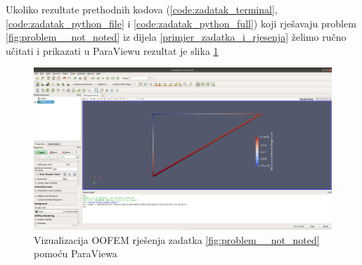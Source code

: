 \documentclass[a4paper,twoside,12pt]{memoir} %
\begin{document}
Ukoliko rezultate prethodnih kodova (\ref{code:zadatak_terminal}, \ref{code:zadatak_python_file} i \ref{code:zadatak_python_full}) koji rješavaju problem \ref{fig:problem__not_noted} iz dijela \ref{primjer_zadatka_i_rjesenja} želimo ručno učitati i prikazati u ParaViewu rezultat je slika \ref{fig:visualization_of_zadatak_paraview}

\begin{figure}[h!t]
\begin{center}
\includegraphics[scale=0.21]{pictures/chapter_zadatak/paraview_zadatak.png}
\caption{Vizualizacija OOFEM rješenja zadatka \ref{fig:problem__not_noted} pomoću ParaViewa}
\label{fig:visualization_of_zadatak_paraview}
\end{center}
\end{figure}





\pagestyle{empty} %

\end{document}
